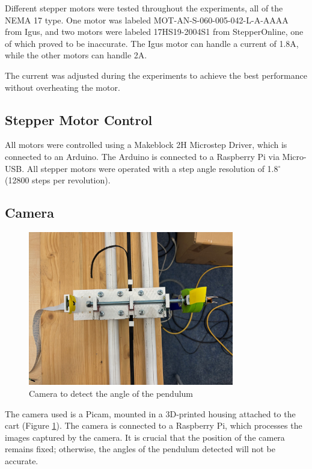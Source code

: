 Different stepper motors were tested throughout the experiments, all of the NEMA 17 type. One motor was labeled MOT-AN-S-060-005-042-L-A-AAAA from Igus, and two motors were labeled 17HS19-2004S1 from StepperOnline, one of which proved to be inaccurate. The Igus motor can handle a current of 1.8A, while the other motors can handle 2A.

The current was adjusted during the experiments to achieve the best performance without overheating the motor.

\subsection{Stepper Motor Control}
All motors were controlled using a Makeblock 2H Microstep Driver, which is connected to an Arduino. The Arduino is connected to a Raspberry Pi via Micro-USB. All stepper motors were operated with a step angle resolution of 1.8$^\circ$ (12800 steps per revolution).

\subsection{Camera}
\begin{figure}[htbp]
    \centering
    \includegraphics[width=0.8\textwidth]{img/camera.jpg}
    \caption{Camera to detect the angle of the pendulum}
    \label{fig:camera}
\end{figure}
The camera used is a Picam, mounted in a 3D-printed housing attached to the cart (Figure \ref{fig:camera}). The camera is connected to a Raspberry Pi, which processes the images captured by the camera. It is crucial that the position of the camera remains fixed; otherwise, the angles of the pendulum detected will not be accurate.

